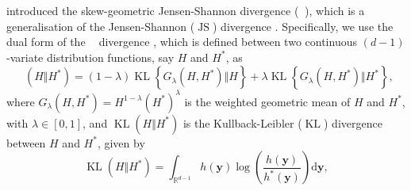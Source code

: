 \documentclass[12pt,compact]{article}
\DeclareMathOperator{\KL}{KL}
\DeclareMathOperator{\JS}{JS}
\newcommand{\JSGa}{\mathop{\mathrm{JS}^{\mathrm{G}_{\lambda}}}\nolimits}
\begin{document}
\citet{Nielsen2019} introduced the skew-geometric Jensen-Shannon divergence ($\JSGa{}$), which is a generalisation of the Jensen-Shannon ($\JS{}$) divergence \citep{Lin1991}. 
Specifically, we use the dual form of the $\JSGa{}$ divergence \citep{Deasy2020}, which is defined between two continuous $(d-1)$-variate distribution functions, say $H$ and $H^*$, as
\begin{equation}\label{eq:jsga}
  \JSGa{(H \Vert H^*)} = (1- \lambda) \KL{\left\{G_{\lambda}(H, H^*) \Vert H\right\}} + \lambda \KL{\left\{G_{\lambda}(H, H^*) \Vert H^*\right\}},
\end{equation}
where $G_{\lambda}(H, H^*) = H^{1-\lambda} {(H^*)}^{\lambda}$ is the weighted geometric mean of $H$ and $H^*$, with $\lambda \in [0, 1]$, and $\KL{(H \Vert H^*)}$ is the Kullback-Leibler ($\KL{}$) divergence between $H$ and $H^*$, given by 
\begin{equation}\label{eq:kl}
  \KL{(H \Vert H^*)} = \int_{\mathbb{R}^{d-1}} h(\symbf{y}) \log\left(\frac{h(\symbf{y})}{h^*(\symbf{y})}\right) \mathrm{d}\symbf{y},
\end{equation}
\end{document}
